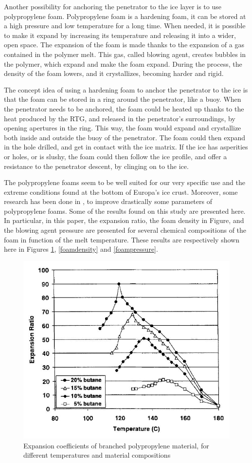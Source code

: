 Another possibility for anchoring the penetrator to the ice layer is to use polypropylene foam. Polypropylene foam is a hardening foam, it can be stored at a high pressure and low temperature for a long time. When needed, it is possible to make it expand by increasing its temperature and releasing it into a wider, open space. The expansion of the foam is made thanks to the expansion of a gas contained in the polymer melt. This gas, called blowing agent, creates bubbles in the polymer, which expand and make the foam expand. During the process, the density of the foam lowers, and it crystallizes, becoming harder and rigid.

The concept idea of using a hardening foam to anchor the penetrator to the ice is that the foam can be stored in a ring around the penetrator, like a buoy. When the penetrator needs to be anchored, the foam could be heated up thanks to the heat produced by the RTG, and released in the penetrator's surroundings, by opening apertures in the ring. This way, the foam would expand and crystallize both inside and outside the buoy of the penetrator. The foam could then expand in the hole drilled, and get in contact with the ice matrix. If the ice has asperities or holes, or is slushy, the foam could then follow the ice profile, and offer a resistance to the penetrator descent, by clinging on to the ice.

The polypropylene foams seem to be well suited for our very specific use and the extreme conditions found at the bottom of Europa's ice crust. Moreover, some research has been done in \cite{naguib2002strategies}, to improve drastically some parameters of polypropylene foams. Some of the results found on this study are presented here. In particular, in this paper, the expansion ratio, the foam density in Figure, and the blowing agent pressure are presented for several chemical compositions of the foam in function of the melt temperature. These results are respectively shown here in Figures \ref{foamexpansion}, \ref{foamdensity} and \ref{foampressure}.

\begin{figure}[htb]
\centering
\includegraphics[width=.48\textwidth]{figures/Paul/foamexpansion}
\caption{Expansion coefficients of branched polypropylene material, for different temperatures and material compositions}
\label{foamexpansion}
\end{figure}

